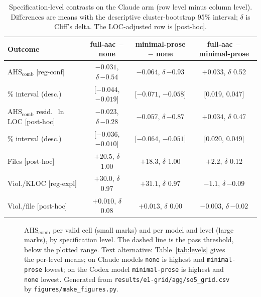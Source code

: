 \documentclass[10pt,a4paper]{article}
\newcommand{\regC}{\textsf{\scriptsize[reg-conf]}}  %
\newcommand{\regX}{\textsf{\scriptsize[reg-expl]}}  %
\newcommand{\ph}{\textsf{\scriptsize[post-hoc]}}    %
\newcommand{\lev}[1]{\texttt{\small #1}}
\newcommand{\AHSc}{\mathrm{AHS}_{\mathrm{comb}}}
\begin{document}
\begin{table}[t]
\centering\small
\caption{Specification-level contrasts on the Claude arm (row level minus column level). Differences are means with
the descriptive cluster-bootstrap 95\% interval; $\delta$ is Cliff's delta. The LOC-adjusted row is \ph{}.}
\label{tab:pairs}
\setlength{\tabcolsep}{4pt}
\begin{tabular}{@{}lccc@{}}
\toprule
Outcome & full-aac $-$ none & minimal-prose $-$ none & full-aac $-$ minimal-prose \\
\midrule
$\AHSc$ \regC{}            & $-0.031$, $\delta\,{-0.54}$ & $-0.064$, $\delta\,{-0.93}$ & $+0.033$, $\delta$ 0.52 \\
\quad 95\% interval (desc.) & [$-0.044$, $-0.019$] & [$-0.071$, $-0.058$] & [0.019, 0.047] \\
$\AHSc$ resid.\ $\ln$ LOC \ph{} & $-0.023$, $\delta\,{-0.28}$ & $-0.057$, $\delta\,{-0.87}$ & $+0.034$, $\delta$ 0.47 \\
\quad 95\% interval (desc.) & [$-0.036$, $-0.010$] & [$-0.064$, $-0.051$] & [0.020, 0.049] \\
Files \ph{}                & $+20.5$, $\delta$ 1.00 & $+18.3$, $\delta$ 1.00 & $+2.2$, $\delta$ 0.12 \\
Viol./KLOC \regX{}         & $+30.0$, $\delta$ 0.97 & $+31.1$, $\delta$ 0.97 & $-1.1$, $\delta\,{-0.09}$ \\
Viol./file \ph{}           & $+0.010$, $\delta$ 0.08 & $+0.013$, $\delta$ 0.00 & $-0.003$, $\delta\,{-0.02}$ \\
\bottomrule
\end{tabular}
\end{table}

\begin{figure}[t]
\centering

\caption{$\AHSc$ per valid cell (small marks) and per model and level (large marks), by specification level. The
dashed line is the pass threshold, below the plotted range. Text alternative: Table~\ref{tab:levels} gives the
per-level means; on Claude models \lev{none} is highest and \lev{minimal-prose} lowest; on the Codex model
\lev{minimal-prose} is highest and \lev{none} lowest. Generated from \texttt{results/e1-grid/agg/so5\_grid.csv} by
\texttt{figures/make\_figures.py}.}
\label{fig:ahs}
\end{figure}
\end{document}
